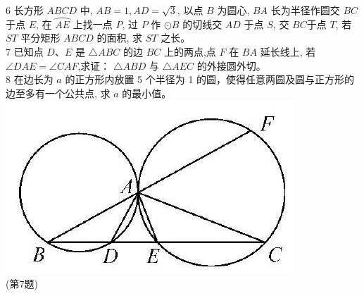 \documentclass[10pt]{article}
\begin{document}
6 长方形 $A B C D$ 中, $A B=1, A D=\sqrt{3}$, 以点 $B$ 为圆心, $B A$ 长为半径作圆交 $B C$ 于点 $E$, 在 $\overparen{A E}$ 上找一点 $P$, 过 $P$ 作 $\odot B$ 的切线交 $A D$ 于点 $S$, 交 $B C$于点 $T$, 若 $S T$ 平分矩形 $A B C D$ 的面积, 求 $S T$ 之长。\\
7 已知点 $D 、 E$ 是 $\triangle A B C$ 的边 $B C$ 上的两点,点 $F$ 在 $B A$ 延长线上, 若 $\angle D A E=\angle C A F$,求证： $\triangle A B D$ 与 $\triangle A E C$ 的外接圆外切。\\
8 在边长为 $a$ 的正方形内放置 5 个半径为 1 的圆，使得任意两圆及圆与正方形的边至多有一个公共点, 求 $a$ 的最小值。\\
\includegraphics[max width=\textwidth, center]{2024_10_30_66b8e5e701da2093c133g-033(1)}\\
(第7题)
\end{document}
